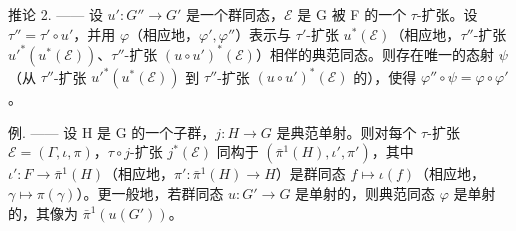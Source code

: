 推论 2. —— 设 \(u': G'' \to G'\) 是一个群同态，\(\mathcal{E}\) 是 G 被 F 的一个 \(\tau\)-扩张。设 \(\tau'' = \tau' \circ u'\)，并用 \(\varphi\)（相应地，\(\varphi', \varphi''\)）表示与 \(\tau'\)-扩张 \(u^*(\mathcal{E})\)（相应地，\(\tau''\)-扩张 \(u'^*(u^*(\mathcal{E}))\)、\(\tau''\)-扩张 \((u \circ u')^*(\mathcal{E})\)）相伴的典范同态。则存在唯一的态射 \(\psi\)（从 \(\tau''\)-扩张 \(u'^*(u^*(\mathcal{E}))\) 到 \(\tau''\)-扩张 \((u \circ u')^*(\mathcal{E})\) 的），使得 \(\varphi'' \circ \psi = \varphi \circ \varphi'\)。

例. —— 设 H 是 G 的一个子群，\(j : H \to G\) 是典范单射。则对每个 \(\tau\)-扩张 \(\mathcal{E} = (\Gamma, \iota, \pi)\)，\(\tau \circ j\)-扩张 \(j^{*}(\mathcal{E})\) 同构于 \((\bar{\pi}^{1}(H), \iota', \pi')\)，其中 \(\iota' : F \to \bar{\pi}^{1}(H)\)（相应地，\(\pi' : \bar{\pi}^{1}(H) \to H\)）是群同态 \(f \mapsto \iota(f)\)（相应地，\(\gamma \mapsto \pi(\gamma)\)）。更一般地，若群同态 \(u : G' \to G\) 是单射的，则典范同态 \(\varphi\) 是单射的，其像为 \(\bar{\pi}^{1}(u(G'))\)。
\relax{}
